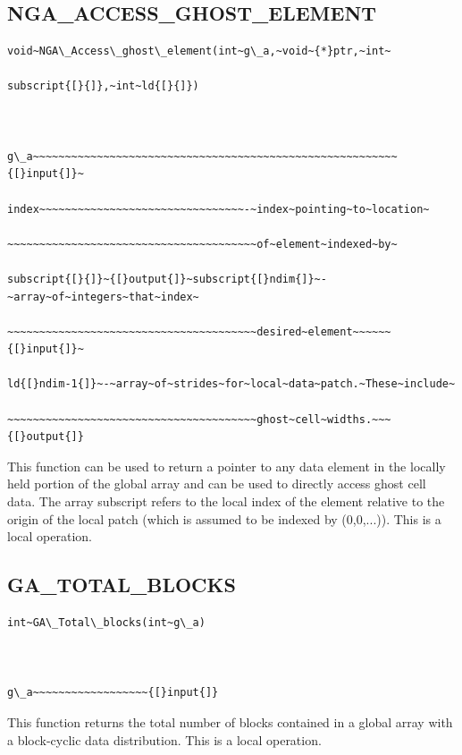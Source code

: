 \subsection*{\label{sub:NGA_ACCESS_GHOST_ELEMENT}NGA\_ACCESS\_GHOST\_ELEMENT}
\begin{verbatim}
void~NGA\_Access\_ghost\_element(int~g\_a,~void~{*}ptr,~int~

subscript{[}{]},~int~ld{[}{]})



g\_a~~~~~~~~~~~~~~~~~~~~~~~~~~~~~~~~~~~~~~~~~~~~~~~~~~~~~~~~~{[}input{]}~

index~~~~~~~~~~~~~~~~~~~~~~~~~~~~~~~~-~index~pointing~to~location~

~~~~~~~~~~~~~~~~~~~~~~~~~~~~~~~~~~~~~~~of~element~indexed~by~

subscript{[}{]}~{[}output{]}~subscript{[}ndim{]}~-~array~of~integers~that~index~

~~~~~~~~~~~~~~~~~~~~~~~~~~~~~~~~~~~~~~~desired~element~~~~~~{[}input{]}~

ld{[}ndim-1{]}~-~array~of~strides~for~local~data~patch.~These~include~

~~~~~~~~~~~~~~~~~~~~~~~~~~~~~~~~~~~~~~~ghost~cell~widths.~~~{[}output{]}
\end{verbatim}
This function can be used to return a pointer to any data element
in the locally held portion of the global array and can be used to
directly access ghost cell data. The array subscript refers to the
local index of the element relative to the origin of the local patch
(which is assumed to be indexed by (0,0,...)). This is a local operation. 


\subsection*{\label{sub:GA_TOTAL_BLOCKS}GA\_TOTAL\_BLOCKS}
\begin{verbatim}
int~GA\_Total\_blocks(int~g\_a)



g\_a~~~~~~~~~~~~~~~~~~{[}input{]}
\end{verbatim}
This function returns the total number of blocks contained in a global
array with a block-cyclic data distribution. This is a local operation. 



